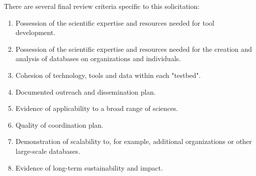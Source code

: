 There are several final review criteria specific to this solicitation:

\begin{enumerate}

\item  Possession of the scientific expertise and resources needed for tool development.
\item Possession of the scientific expertise and resources needed for the creation and analysis of databases on organizations and individuals.
\item  Cohesion of technology, tools and data within each "testbed".
\item  Documented outreach and dissemination plan.
\item Evidence of applicability to a broad range of sciences.
\item Quality of coordination plan.
\item Demonstration of scalability to, for example, additional organizations or other large-scale databases.
\item Evidence of long-term sustainability and impact.

\end{enumerate}














